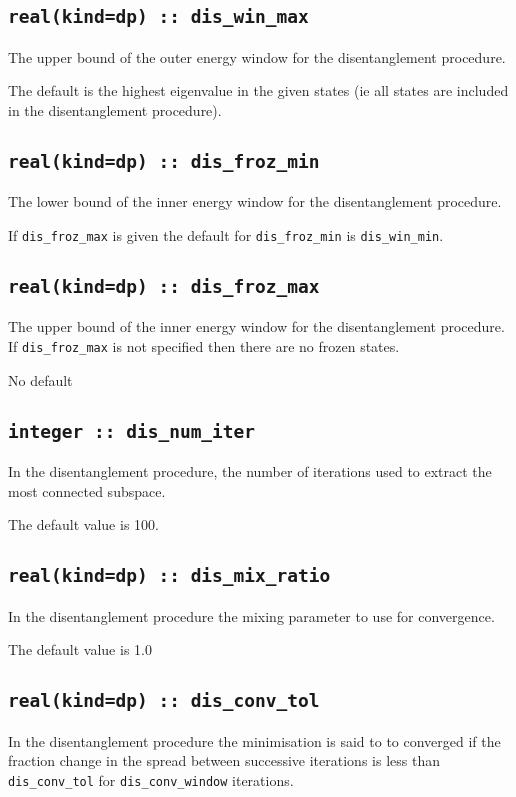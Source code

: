 \subsection[dis\_win\_max]{\tt real(kind=dp) :: dis\_win\_max}
The upper bound of the outer energy window for the disentanglement
procedure.

The default is the highest eigenvalue in the given states (ie all states
are included in the disentanglement procedure).

\subsection[dis\_froz\_min]{\tt real(kind=dp) :: dis\_froz\_min}
The lower bound of the inner energy window for the disentanglement
procedure. 

If \verb#dis_froz_max# is given the default for 
\verb#dis_froz_min# is \verb#dis_win_min#.


\subsection[dis\_froz\_max]{\tt real(kind=dp) :: dis\_froz\_max}
The upper bound of the inner energy window for the disentanglement
procedure. If \verb#dis_froz_max# is  not specified then 
there are no frozen states.

No default

\subsection[dis\_num\_iter]{\tt integer :: dis\_num\_iter}
In the disentanglement procedure, the
number of iterations used to extract the most connected subspace.

The default value is 100.

\subsection[dis\_mix\_ratio]{\tt real(kind=dp) :: dis\_mix\_ratio}
In the disentanglement procedure the mixing parameter to use for
convergence.

The default value is 1.0

\subsection[dis\_conv\_tol]{\tt real(kind=dp) :: dis\_conv\_tol}

In the disentanglement procedure the minimisation is said to to converged
if the fraction change in the spread between successive
iterations is less than
\verb#dis_conv_tol# for \verb#dis_conv_window# iterations.

